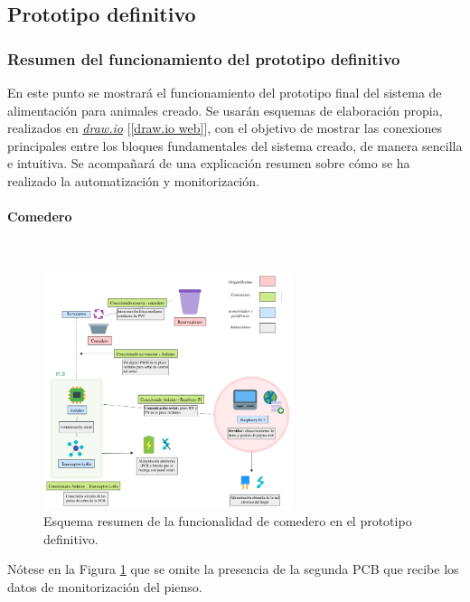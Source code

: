 \documentclass[12pt]{article}
\newcommand{\subsubsubsection}[1]{\paragraph{#1}\mbox{}\\}
\begin{document}
	\pagebreak
	
	\subsection[Prototipo definitivo]{Prototipo definitivo}
	
	\subsubsection{Resumen del funcionamiento del prototipo definitivo}
	\label{subsubsection: resumen funcionamiento prototipo definitivo}
	
	\noindent En este punto se mostrará el funcionamiento del prototipo final del sistema de alimentación para animales creado. Se usarán esquemas de elaboración propia, realizados en \href{https://app.diagrams.net/}{\textit{draw.io}} [\ref{draw.io web}], con el objetivo de mostrar las conexiones principales entre los bloques fundamentales del sistema creado, de manera sencilla e intuitiva. Se acompañará de una explicación resumen  sobre cómo se ha realizado la automatización y monitorización.
		
	\subsubsubsection{Comedero}

	\begin{figure}[h!]
		\begin{center}
			\includegraphics[width=0.65\textwidth]{img/conexiones tfg-comedero.png}
			\caption{Esquema resumen de la funcionalidad de comedero en el prototipo definitivo.}
			\label{Conexiones TFG comedero.}
		\end{center}
	\end{figure}
	
	\noindent Nótese en la Figura \ref{Conexiones TFG comedero.} que se omite la presencia de la segunda PCB que recibe los datos de monitorización del pienso.  
	
\end{document}
